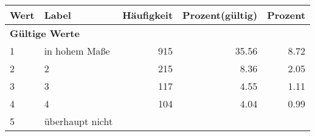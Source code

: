      \begin{longtable}{lXrrr}
     \toprule
     \textbf{Wert} & \textbf{Label} & \textbf{Häufigkeit} & \textbf{Prozent(gültig)} & \textbf{Prozent} \\
     \endhead
     \midrule
     \multicolumn{5}{l}{\textbf{Gültige Werte}}\\

     1 &
     \multicolumn{1}{X}{ in hohem Maße   } &


       \num{915} &
       \num[round-mode=places,round-precision=2]{35,56} &
         \num[round-mode=places,round-precision=2]{8,72} \\

     2 &
     \multicolumn{1}{X}{ 2   } &


       \num{215} &
       \num[round-mode=places,round-precision=2]{8,36} &
         \num[round-mode=places,round-precision=2]{2,05} \\

     3 &
     \multicolumn{1}{X}{ 3   } &


       \num{117} &
       \num[round-mode=places,round-precision=2]{4,55} &
         \num[round-mode=places,round-precision=2]{1,11} \\

     4 &
     \multicolumn{1}{X}{ 4   } &


       \num{104} &
       \num[round-mode=places,round-precision=2]{4,04} &
         \num[round-mode=places,round-precision=2]{0,99} \\

     5 &
     \multicolumn{1}{X}{ überhaupt nicht   } &



\end{longtable}
